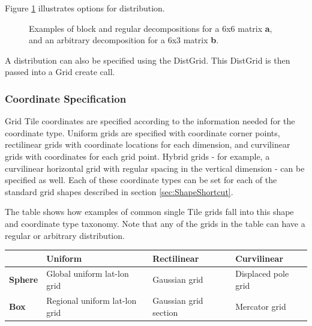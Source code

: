 {Figure \ref{fig:GridDecomps} illustrates options for distribution.
\begin{figure}
\caption{Examples of block and regular decompositions for
a 6x6 matrix {\bf a}, and an arbitrary decomposition for a 6x3 matrix {\bf b}.}
\label{fig:GridDecomps}
\end{figure}

A distribution can also be specified using the DistGrid.  This
DistGrid is then passed into a Grid create call.

\subsubsection{Coordinate Specification}

Grid Tile coordinates are specified
according to the information needed for the coordinate type.
Uniform grids are specified with coordinate corner
points, rectilinear grids with coordinate locations for each dimension,
and curvilinear grids with coordinates for each grid point.  Hybrid
grids - for example, a curvilinear horizontal grid with regular spacing
in the vertical dimension - can be specified as well.  Each of these
coordinate types can be set for each of the standard grid shapes
described in section \ref{sec:ShapeShortcut}.  

The table shows how examples of common single Tile grids fall 
into this shape and coordinate type taxonomy.  Note that any
of the grids in the table can have a regular or arbitrary distribution.

\medskip
\begin{tabular}{|p{.9in}|p{1.7in}|p{1.7in}|p{1.7in}|}
\hline
 & {\bf Uniform} & {\bf Rectilinear} & {\bf Curvilinear} \\ 
\hline
{\bf Sphere} & Global uniform lat-lon grid & Gaussian grid & Displaced pole grid \\
\hline
{\bf Box} & Regional uniform lat-lon grid & Gaussian grid section & Mercator grid \\
\hline
\end{tabular}

}
